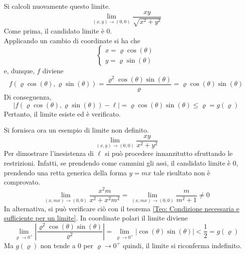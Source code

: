 \begin{example}
    Si calcoli nuovamente questo limite.
    \begin{equation*}
        \lim_{(x, y) \to (0,0)}{\frac{xy}{\sqrt{x^2+y^2}}}
    \end{equation*}
    Come prima, il candidato limite è $0$.\\
    Applicando un cambio di coordinate si ha che
    \begin{equation*}
        \begin{cases}
            x=\varrho\cos(\theta)\\
            y=\varrho\sin(\theta)
        \end{cases}
    \end{equation*}
    e, dunque, $f$ diviene
    \begin{equation*}
        f(\varrho\cos(\theta),\varrho\sin(\theta))=\frac{\varrho^2\cos(\theta)\sin(\theta)}{\varrho}=\varrho\cos(\theta)\sin(\theta)
    \end{equation*}
    Di conseguenza,
    \begin{equation*}
        |f(\varrho\cos(\theta),\varrho\sin(\theta))- \ell|=\varrho\cos(\theta)\sin(\theta) \leq \varrho = g(\varrho)
    \end{equation*}
    Pertanto, il limite esiste ed è verificato.
\end{example}
\begin{example}
    Si fornisca ora un esempio di limite non definito.
    \begin{equation*}
        \lim_{(x,y) \to (0,0)}{\frac{xy}{x^2+y^2}}
    \end{equation*}
    Per dimostrare l'inesistenza di $\ell$ si può procedere innanzitutto sfruttando le restrizioni. Infatti, se prendendo come cammini gli assi, il candidato limite è $0$, prendendo una retta generica della forma $y=mx$ tale risultato non è comprovato.
    \begin{equation*}
        \lim_{(x, mx) \to (0,0)}{\frac{x^2m}{x^2+x^2m^2}}=\lim_{(x, mx) \to (0,0)}{\frac{m}{m^2+1}} \neq 0
    \end{equation*}
    In alternativa, si può verificare ciò con il teorema \ref{Teo: Condizione necessaria e sufficiente per un limite}. In coordinate polari il limite diviene
    \begin{equation*}
        \lim_{\varrho \to 0^+}{\left|\frac{\varrho^2\cos(\theta)\sin(\theta)}{\varrho^2}\right|}=\lim_{\varrho \to 0^+}{\left|\cos(\theta)\sin(\theta)\right|} < \frac{1}{2}=g(\varrho)
    \end{equation*}
    Ma $g(\varrho)$ non tende a $0$ per $\varrho \to 0^+$ quindi, il limite si riconferma indefinito.
\end{example}
